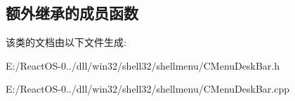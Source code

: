 \subsection*{额外继承的成员函数}


该类的文档由以下文件生成\+:\begin{DoxyCompactItemize}
\item 
E\+:/\+React\+O\+S-\/0../dll/win32/shell32/shellmenu/C\+Menu\+Desk\+Bar.\+h\item 
E\+:/\+React\+O\+S-\/0../dll/win32/shell32/shellmenu/C\+Menu\+Desk\+Bar.\+cpp\end{DoxyCompactItemize}
